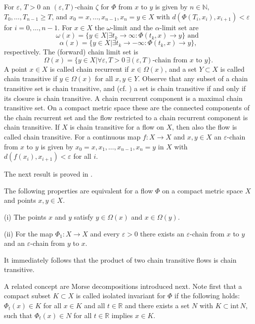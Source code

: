 	For $\varepsilon,\,T>0$ an $(\varepsilon,T)$-chain $\zeta$ for $\Phi$ from $x$
	to $y$ is given by $n\in\mathbb{N}\mathbf{,}$ $T_{0},\ldots,T_{n-1}\geq T$,
	and $x_{0}=x,\ldots,x_{n-1},x_{n}=y\in X$ with $d(\Phi(T_{i},x_{i}%
	),x_{i+1})<\varepsilon$ for $i=0,\ldots,n-1$. For $x\in X$ the $\omega$-limit
	and the $\alpha$-limit set are
	\[
	\omega(x)=\{y\in X|\exists t_{k}\rightarrow\infty:\Phi(t_{k},x)\rightarrow
	y\}\mbox{ and }
	\]%
	\[
	\alpha(x)=\{y\in X\left\vert \exists t_{k}\rightarrow-\infty:\Phi
	(t_{k},x)\rightarrow y\right.  \},
	\]
	respectively. The (forward) chain limit set is
	\[
	\Omega(x)=\{y\in X\left\vert \forall\varepsilon,T>0\,\exists(\varepsilon
	,T)\mbox{-chain from }x\mbox{ to }y\right.  \}.
	\]
	A point $x\in X$ is called chain recurrent if $x\in\Omega(x)$, and a set
	$Y\subset X$ is called chain transitive if $y\in\Omega(x)$ for all $x,y\in Y$.
	Observe that any subset of a chain transitive set is chain transitive, and
	(cf. \cite[Proposition 2.7.10]{AlonN07}) a set is chain transitive if and only
	if its closure is chain transitive. A chain recurrent component is a maximal
	chain transitive set. On a compact metric space these are the connected
	components of the chain recurrent set and the flow restricted to a chain
	recurrent component is chain transitive. If $X$ is chain transitive for a flow
	on $X$, then also the flow is called chain transitive. For a continuous map
	$f:X\rightarrow X$ and $x,y\in X$ an $\varepsilon$-chain from $x$ to $y$ is
	given by $x_{0}=x,x_{1},\ldots,x_{n-1},x_{n}=y$ in $X$ with $d(f(x_{i}%
	),x_{i+1})<\varepsilon$ for all $i$.
	
	The next result is proved in \cite[Theorem 2.7.18]{AlonN07}.
	
	\begin{theorem}
		\label{Theorem_chains}The following properties are equivalent for a flow
		$\Phi$ on a compact metric space $X$ and points $x,y\in X$.
		
		(i) The points $x$ and $y$ satisfy $y\in\Omega(x)$ and $x\in\Omega(y)$.
		
		(ii) For the map $\Phi_{1}:X\rightarrow X$ and every $\varepsilon>0$ there
		exists an $\varepsilon$-chain from $x$ to $y$ and an $\varepsilon$-chain from
		$y$ to $x$.
	\end{theorem}
	
	It immediately follows that the product of two chain transitive flows is chain transitive.
	
	A related concept are Morse decompositions introduced next. Note first that a
	compact subset $K\subset X$ is called isolated invariant for $\Phi$ if the
	following holds: $\Phi_{t}(x)\in K$ for all $x\in K$ and all $t\in\mathbb{R}$
	and there exists a set $N$ with $K\subset\mathrm{int}\,N$, such that $\Phi
	_{t}(x)\in N$ for all $t\in\mathbb{R}$ implies $x\in K$.
	
